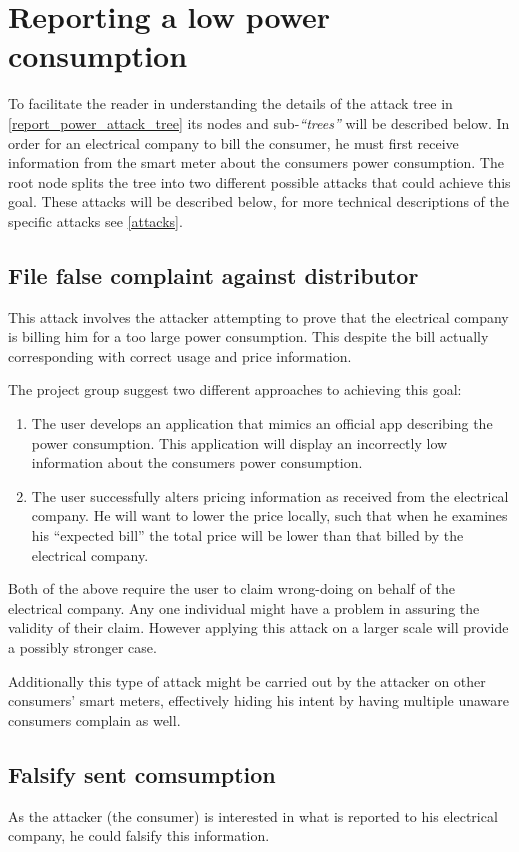 
\section{Reporting a low power consumption}
To facilitate the reader in understanding the details of the attack tree in \cref{report_power_attack_tree} its nodes and sub-\emph{``trees''} will be described below.
In order for an electrical company to bill the consumer, he must first receive information from the smart meter about the consumers power consumption.
The root node splits the tree into two different possible attacks that could achieve this goal.
These attacks will be described below, for more technical descriptions of the specific attacks see \cref{attacks}.

\subsection{File false complaint against distributor}
This attack involves the attacker attempting to prove that the electrical company is billing him for a too large power consumption.
This despite the bill actually corresponding with correct usage and price information.

The project group suggest two different approaches to achieving this goal:
\begin{enumerate}
  \item The user develops an application that mimics an official app describing the power consumption.
  This application will display an incorrectly low information about the consumers power consumption.
  \item The user successfully alters pricing information as received from the electrical company.
  He will want to lower the price locally, such that when he examines his ``expected bill'' the total price will be lower than that billed by the electrical company.
\end{enumerate}
Both of the above require the user to claim wrong-doing on behalf of the electrical company.
Any one individual might have a problem in assuring the validity of their claim.
However applying this attack on a larger scale will provide a possibly stronger case.

Additionally this type of attack might be carried out by the attacker on other consumers' smart meters, effectively hiding his intent by having multiple unaware consumers complain as well.

\subsection{Falsify sent comsumption}
As the attacker (the consumer) is interested in what is reported to his electrical company, he could falsify this information.

